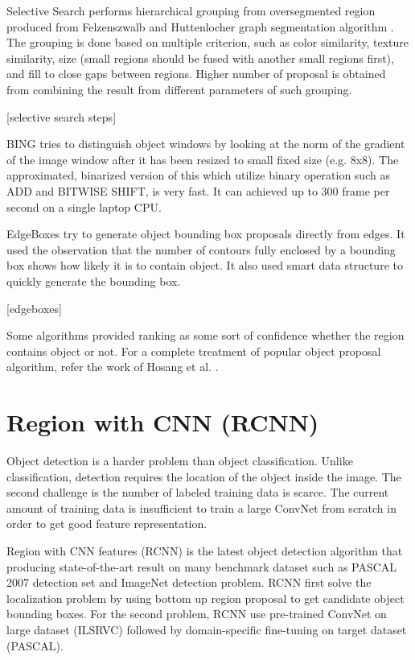 \documentclass[a4paper,11pt]{kth-mag}
\begin{document}
Selective Search \cite{selectivesearch} performs hierarchical grouping from oversegmented region produced from Felzenszwalb and Huttenlocher graph segmentation algorithm \cite{felzenszwalb}. The grouping is done based on multiple criterion, such as color similarity, texture similarity, size (small regions should be fused with another small regions first), and fill to close gaps between regions. Higher number of proposal is obtained from combining the result from different parameters of such grouping.

[selective search steps]

BING \cite{bing} tries to distinguish object windows by looking at the norm of the gradient of the image window after it has been resized to small fixed size (e.g. 8x8). The approximated, binarized version of this which utilize binary operation such as ADD and BITWISE SHIFT, is very fast. It can achieved up to 300 frame per second on a single laptop CPU.

EdgeBoxes \cite{zitnick2014edgeboxes} try to generate object bounding box proposals directly from edges. It used the observation that the number of contours fully enclosed by a bounding box shows how likely it is to contain object. It also used smart data structure to quickly generate the bounding box.

[edgeboxes]

Some algorithms provided ranking as some sort of confidence whether the region contains object or not. For a complete treatment of popular object proposal algorithm, refer the work of Hosang et al. \cite{hosang}.

\section{Region with CNN (RCNN)}

Object detection is a harder problem than object classification. Unlike classification, detection requires the location of the object inside the image. The second challenge is the number of labeled training data is scarce. The current amount of training data is insufficient to train a large ConvNet from scratch in order to get good feature representation.

Region with CNN features (RCNN) is the latest object detection algorithm that producing state-of-the-art result on many benchmark dataset such as PASCAL 2007 detection set and ImageNet detection problem. RCNN first solve the localization problem by using bottom up region proposal to get candidate object bounding boxes. For the second problem, RCNN use pre-trained ConvNet on large dataset (ILSRVC) followed by domain-specific fine-tuning on target dataset (PASCAL).
\end{document}
